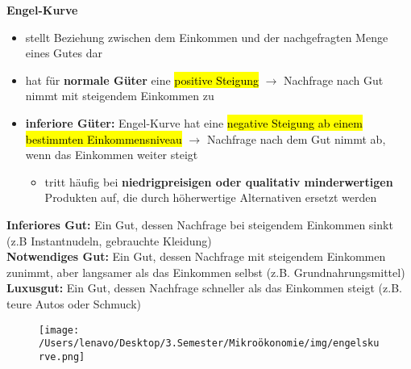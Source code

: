 \documentclass[a4paper, 10pt]{article}
\begin{document}
\noindent\textbf{Engel-Kurve}
\begin{itemize}
    \item stellt Beziehung zwischen dem Einkommen und der nachgefragten Menge eines Gutes dar
    \item hat für \textbf{normale Güter} eine \hl{positive Steigung} $\rightarrow$ Nachfrage nach Gut nimmt mit steigendem Einkommen zu
    \item \textbf{inferiore Güter:} Engel-Kurve hat eine \hl{negative Steigung ab einem bestimmten Einkommensniveau} $\rightarrow$ Nachfrage nach dem Gut nimmt ab, wenn das Einkommen weiter steigt
    \begin{itemize}
        \item tritt häufig bei \textbf{niedrigpreisigen oder qualitativ minderwertigen} Produkten auf, die durch höherwertige Alternativen ersetzt werden
    \end{itemize}
\end{itemize}

\begin{definitionbox}
    \textbf{Inferiores Gut:} Ein Gut, dessen Nachfrage bei steigendem Einkommen sinkt (z.B Instantnudeln, gebrauchte Kleidung)\\[2mm]
    \textbf{Notwendiges Gut:} Ein Gut, dessen Nachfrage mit steigendem Einkommen zunimmt, aber langsamer als das Einkommen selbst (z.B. Grundnahrungsmittel)\\[2mm]
    \textbf{Luxusgut:} Ein Gut, dessen Nachfrage schneller als das Einkommen steigt (z.B. teure Autos oder Schmuck)
\end{definitionbox}
\newpage
\begin{figure}[h]
    \centering
    \texttt{[image: /Users/lenavo/Desktop/3.Semester/Mikroökonomie/img/engelskurve.png]}
    \caption{}
    \label{fig:enter-label}
\end{figure}
\end{document}
